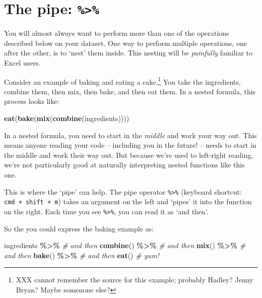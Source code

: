 \documentclass[
]{book}
\newenvironment{Shaded}{\begin{snugshade}}{\end{snugshade}}
\newcommand{\CommentTok}[1]{\textcolor[rgb]{0.56,0.35,0.01}{\textit{#1}}}
\newcommand{\KeywordTok}[1]{\textcolor[rgb]{0.13,0.29,0.53}{\textbf{#1}}}
\newcommand{\NormalTok}[1]{#1}
\newcommand{\OperatorTok}[1]{\textcolor[rgb]{0.81,0.36,0.00}{\textbf{#1}}}
\newcommand{\StringTok}[1]{\textcolor[rgb]{0.31,0.60,0.02}{#1}}
\begin{document}
\hypertarget{the-pipe}{%
\section{\texorpdfstring{The pipe: \texttt{\%\textgreater{}\%}}{The pipe: \%\textgreater\%}}\label{the-pipe}}

You will almost always want to perform more than one of the operations described below on your dataset. One way to perform multiple operations, one after the other, is to `nest' them inside. This nesting will be \emph{painfully} familiar to Excel users.

Consider an example of baking and eating a cake.\footnote{XXX cannot remember the source for this example; probably Hadley? Jenny Bryan? Maybe somenone else?} You take the ingredients, combine them, then mix, then bake, and then eat them. In a nested formula, this process looks like:

\begin{Shaded}
\begin{Highlighting}[]
\KeywordTok{eat}\NormalTok{(}\KeywordTok{bake}\NormalTok{(}\KeywordTok{mix}\NormalTok{(}\KeywordTok{combine}\NormalTok{(ingredients))))}
\end{Highlighting}
\end{Shaded}

In a nested formula, you need to start in the \emph{middle} and work your way out. This means anyone reading your code -- including you in the future! -- needs to start in the middle and work their way out. But because we're used to left-right reading, we're not particularly good at naturally interpreting nested functions like this one.

This is where the `pipe' can help. The pipe operator \texttt{\%\textgreater{}\%} (keyboard shortcut: \texttt{cmd\ +\ shift\ +\ m}) takes an argument on the left and `pipes' it into the function on the right. Each time you see \texttt{\%\textgreater{}\%}, you can read it as `and then'.

So the you could express the baking example as:

\begin{Shaded}
\begin{Highlighting}[]
\NormalTok{ingredients }\OperatorTok{\%\textgreater{}\%}\StringTok{ }\CommentTok{\# and then}
\StringTok{  }\KeywordTok{combine}\NormalTok{() }\OperatorTok{\%\textgreater{}\%}\StringTok{ }\CommentTok{\# and then}
\StringTok{  }\KeywordTok{mix}\NormalTok{() }\OperatorTok{\%\textgreater{}\%}\StringTok{ }\CommentTok{\# and then}
\StringTok{  }\KeywordTok{bake}\NormalTok{() }\OperatorTok{\%\textgreater{}\%}\StringTok{ }\CommentTok{\# and then}
\StringTok{  }\KeywordTok{eat}\NormalTok{() }\CommentTok{\# yum!}
\end{Highlighting}
\end{Shaded}
\end{document}
